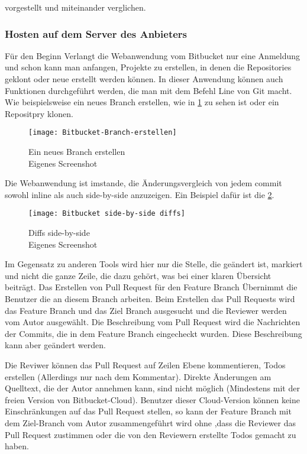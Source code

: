 vorgestellt und miteinander verglichen.

\subsubsection{Hosten auf dem Server des Anbieters}
\label{subsubsec:Bitbucket-Cloud}

Für den Beginn Verlangt die Webanwendung vom Bitbucket nur eine Anmeldung und schon kann man anfangen, Projekte zu erstellen, in denen die Repositories geklont oder neue erstellt werden können. In dieser Anwendung können auch Funktionen durchgeführt werden, die man mit dem Befehl Line von Git macht. Wie beispielsweise ein neues Branch erstellen, wie in \cref{fig:Bitbucket-Branch-erstellen} zu sehen ist oder ein Repositpry klonen.

\begin{figure}[H]
	\centering
	\texttt{[image: Bitbucket-Branch-erstellen]}
	\caption[Branch auf Bitbuckets Anwendung erstellen]{Ein neues Branch erstellen\\Eigenes Screenshot}
	\label{fig:Bitbucket-Branch-erstellen}
\end{figure}

Die Webanwendung ist imstande, die Änderungsvergleich von jedem commit sowohl inline als auch side-by-side anzuzeigen. Ein Beispiel dafür ist die \cref{fig:Diffs_side-by-side}.

\begin{figure}[H]
	\centering
	\texttt{[image: Bitbucket side-by-side diffs]}
	\caption[Bitbuckets Webanwendung side-by-side Änerungsvergleich]{Diffs side-by-side\\Eigenes Screenshot}
	\label{fig:Diffs_side-by-side}
\end{figure}

Im Gegensatz zu anderen Tools wird hier nur die Stelle, die geändert ist, markiert und nicht die ganze Zeile, die dazu gehört, was bei einer klaren Übersicht beiträgt.
Das Erstellen von Pull Request für den Feature Branch Übernimmt die Benutzer die an diesem Branch arbeiten. Beim Erstellen das Pull Requests wird das Feature Branch und das Ziel Branch ausgesucht und die Reviewer werden vom Autor ausgewählt. Die Beschreibung vom Pull Request wird die Nachrichten der Commits, die in dem Feature Branch eingecheckt wurden. Diese Beschreibung kann aber geändert werden.

Die Reviwer können das Pull Request auf Zeilen Ebene kommentieren, Todos erstellen (Allerdings nur nach dem Kommentar). Direkte Änderungen am Quelltext, die der Autor annehmen kann, sind nicht möglich (Mindestens mit der freien Version von Bitbucket-Cloud). Benutzer dieser Cloud-Version können keine Einschränkungen auf das Pull Request stellen, so kann der Feature Branch mit dem Ziel-Branch vom Autor zusammengeführt wird ohne ,dass die Reviewer das Pull Request zustimmen oder die von den Reviewern erstellte Todos gemacht zu haben.

